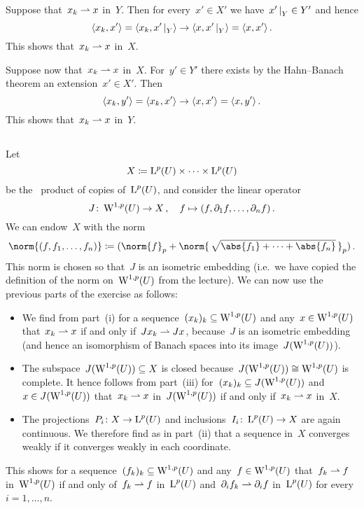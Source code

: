 \subsection{}

Suppose that~$x_k \rightharpoonup x$ in~$Y$.
Then for every~$x' \in X'$ we have~$\restrict{x'}{Y} \in Y'$ and hence
\[
      \bil{x_k, x'}
  =   \bil{x_k, \restrict{x'}{Y}}
  \to \bil{x, \restrict{x'}{Y}}
  =   \bil{x, x'} \,.
\]
This shows that~$x_k \rightharpoonup x$ in~$X$.

Suppose now that~$x_k \rightharpoonup x$ in~$X$.
For~$y' \in Y'$ there exists by the Hahn--Banach theorem an extension~$x' \in X'$.
Then
\[
      \langle x_k, y'\rangle
  =   \langle x_k, x'\rangle
  \to \langle x, x'\rangle
  =   \langle x, y'\rangle \,.
\]
This shows that~$x_k \rightharpoonup x$ in~$Y$.





\subsection{}

Let
\[
  X
  \coloneqq
  \operatorname{L}^p(U) \times \dotsb \times \operatorname{L}^p(U)
\]
be the~ product of copies of~$\operatorname{L}^p(U)$, and consider the linear operator
\[
          J
  \colon  \operatorname{W}^{1,p}(U)
  \to     X \,,
  \quad   f
  \mapsto (f, \partial_1 f, \dotsc, \partial_n f) \,.
\]
We can endow~$X$ with the norm
\[
  \norm{(f, f_1, \dotsc, f_n)}
  \defined
  ( \norm{f}_p + \norm{\,\sqrt{\abs{f_1} + \dotsb + \abs{f_n}}\,}_p ) \,.
\]
This norm is chosen so that~$J$ is an isometric embedding (i.e.\ we have copied the definition of the norm on~$\operatorname{W}^{1,p}(U)$ from the lecture).
We can now use the previous parts of the exercise as follows:
\begin{itemize}
  \item
    We find from part~(i) for a sequence~$(x_k)_k \subseteq \operatorname{W}^{1,p}(U)$ and any~$x \in \operatorname{W}^{1,p}(U)$ that~$x_k \rightharpoonup x$ if and only if~$J x_k \rightharpoonup J x$, because~$J$ is an isometric embedding (and hence an isomorphism of Banach spaces into its image~$J(\operatorname{W}^{1,p}(U))$).
  \item
    The subspace~$J(\operatorname{W}^{1,p}(U)) \subseteq X$ is closed because~$J(\operatorname{W}^{1,p}(U)) \cong \operatorname{W}^{1,p}(U)$ is complete.
    It hence follows from part~(iii) for~$(x_k)_k \subseteq J(\operatorname{W}^{1,p}(U))$ and~$x \in J(\operatorname{W}^{1,p}(U))$ that~$x_k \rightharpoonup x$ in~$J(\operatorname{W}^{1,p}(U))$ if and only if~$x_k \rightharpoonup x$ in~$X$.
  \item
    The projections~$P_i \colon X \to \operatorname{L}^p(U)$ and inclusions~$I_i \colon \operatorname{L}^p(U) \to X$ are again continuous.
    We therefore find as in part~(ii) that a sequence in~$X$ converges weakly if it converges weakly in each coordinate.
\end{itemize}
This shows for a sequence~$(f_k)_k \subseteq \operatorname{W}^{1,p}(U)$ and any~$f \in \operatorname{W}^{1,p}(U)$ that~$f_k \rightharpoonup f$ in~$\operatorname{W}^{1,p}(U)$ if and only of~$f_k \rightharpoonup f$ in~$\operatorname{L}^p(U)$ and~$\partial_i f_k \rightharpoonup \partial_i f$ in~$\operatorname{L}^p(U)$ for every~$i = 1, \dotsc, n$.











